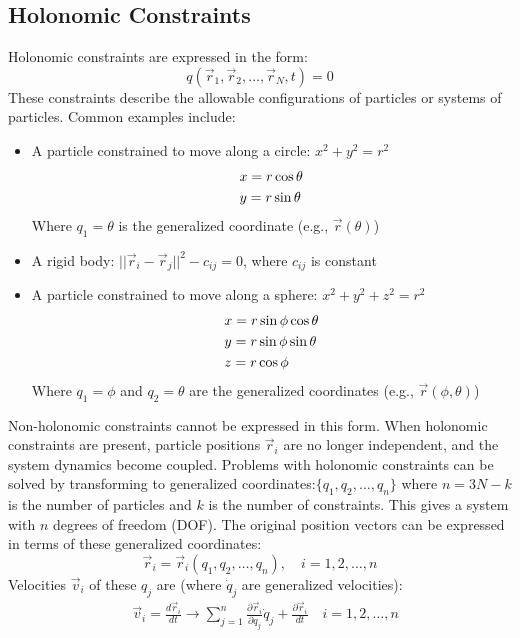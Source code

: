 \documentclass[conference]{IEEEtran}
\begin{document}
\subsection{Holonomic Constraints}
Holonomic constraints are expressed in the form:
\begin{equation}
    q(\vec{r}_1, \vec{r}_2, \ldots, \vec{r}_N, t) = 0
\end{equation}
These constraints describe the allowable configurations of particles or systems of particles. Common examples include:
\begin{itemize}
    \item A particle constrained to move along a circle: $x^2 + y^2 = r^2$ \begin{align}
        & x = r\cos\theta \notag \\
        & y = r\sin\theta 
    \end{align}
    Where $q_1 = \theta$ is the generalized coordinate (e.g., $\vec{r}(\theta)$)
    \item A rigid body: $||\vec{r}_i - \vec{r}_j||^2 - c_{ij} = 0$, where $c_{ij}$ is constant 
    \item A particle constrained to move along a sphere: $x^2 + y^2 + z^2 = r^2$ \begin{align}
        & x = r\sin\phi\cos\theta \notag \\
        & y = r\sin\phi\sin\theta \notag \\
        & z = r\cos\phi
    \end{align}
    Where $q_1 = \phi$ and $q_2 = \theta$ are the generalized coordinates (e.g., $\vec{r}(\phi, \theta)$)
\end{itemize}
Non-holonomic constraints cannot be expressed in this form. When holonomic constraints are present, particle positions $\vec{r}_i$ are no longer independent, and the system dynamics become coupled. Problems with holonomic constraints can be solved by transforming to generalized coordinates:$\{q_1, q_2, \ldots, q_{n}\}$ where $n = 3N - k$ is the number of particles and $k$ is the number of constraints. This gives a system with $n$ degrees of freedom (DOF). The original position vectors can be expressed in terms of these generalized coordinates:
\begin{equation}
    \vec{r}_i = \vec{r}_i(q_1, q_2, \ldots, q_{n}), \quad i = 1,2,\ldots,n
\end{equation}
Velocities $\vec{v}_i$ of these $q_j$ are (where $\dot{q}_j$ are generalized velocities):
\begin{align}
    & \vec{v}_i = \frac{d\vec{r}_i}{dt} \to \sum_{j=1}^n\frac{\partial \vec{r}_i}{\partial q_j}\dot{q}_j + \frac{\partial \vec{r}_i}{dt} \quad i = 1,2,\ldots,n 
\end{align}
\end{document}
